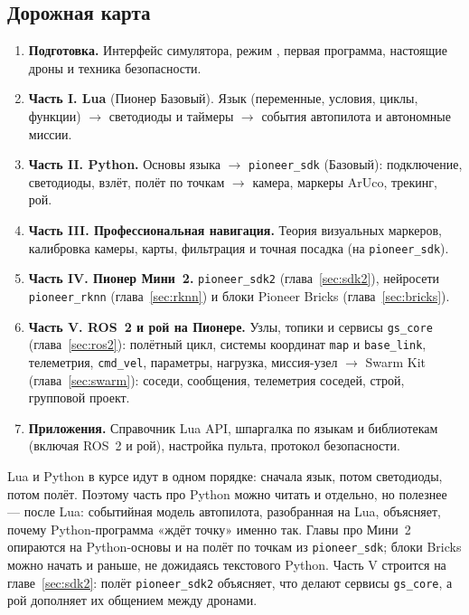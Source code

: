 \subsection*{Дорожная карта}

\begin{enumerate}
    \item \textbf{Подготовка.} Интерфейс симулятора, режим , первая программа, настоящие дроны и техника безопасности.
    \item \textbf{Часть I. Lua} (Пионер Базовый). Язык (переменные, условия, циклы, функции) $\to$ светодиоды и таймеры $\to$ события автопилота и автономные миссии.
    \item \textbf{Часть II. Python.} Основы языка $\to$ \texttt{pioneer\_sdk} (Базовый): подключение, светодиоды, взлёт, полёт по точкам $\to$ камера, маркеры ArUco, трекинг, рой.
    \item \textbf{Часть III. Профессиональная навигация.} Теория визуальных маркеров, калибровка камеры, карты, фильтрация и точная посадка (на \texttt{pioneer\_sdk}).
    \item \textbf{Часть IV. Пионер Мини~2.} \texttt{pioneer\_sdk2} (глава~\ref{sec:sdk2}), нейросети \texttt{pioneer\_rknn} (глава~\ref{sec:rknn}) и блоки Pioneer Bricks (глава~\ref{sec:bricks}).
    \item \textbf{Часть V. ROS~2 и рой на Пионере.} Узлы, топики и сервисы \texttt{gs\_core} (глава~\ref{sec:ros2}): полётный цикл, системы координат \texttt{map} и \texttt{base\_link}, телеметрия, \texttt{cmd\_vel}, параметры, нагрузка, миссия-узел $\to$ Swarm Kit (глава~\ref{sec:swarm}): соседи, сообщения, телеметрия соседей, строй, групповой проект.
    \item \textbf{Приложения.} Справочник Lua API, шпаргалка по языкам и библиотекам (включая ROS~2 и рой), настройка пульта, протокол безопасности.
\end{enumerate}

Lua и Python в курсе идут в одном порядке: сначала язык, потом светодиоды, потом полёт. Поэтому часть про Python можно читать и отдельно, но полезнее --- после Lua: событийная модель автопилота, разобранная на Lua, объясняет, почему Python-программа «ждёт точку» именно так. Главы про Мини~2 опираются на Python-основы и на полёт по точкам из \texttt{pioneer\_sdk}; блоки Bricks можно начать и раньше, не дожидаясь текстового Python. Часть V строится на главе~\ref{sec:sdk2}: полёт \texttt{pioneer\_sdk2} объясняет, что делают сервисы \texttt{gs\_core}, а рой дополняет их общением между дронами.

